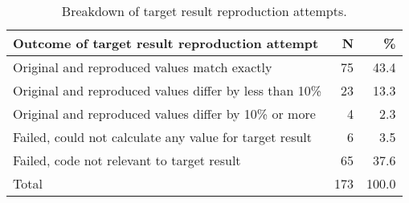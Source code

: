 \begin{table}[ht]
\centering
\begin{tabular}{lrr}
  \hline
Outcome of target result reproduction attempt & N & \% \\ 
  \hline
Original and reproduced values match exactly & 75 & 43.4 \\ 
  Original and reproduced values differ by less than 10\% & 23 & 13.3 \\ 
  Original and reproduced values differ by 10\% or more & 4 & 2.3 \\ 
  Failed, could not calculate any value for target result & 6 & 3.5 \\ 
  Failed, code not relevant to target result & 65 & 37.6 \\ 
  Total & 173 & 100.0 \\ 
   \hline
\end{tabular}
\caption{Breakdown of target result reproduction attempts.} 
\label{tab:ma_res_repro_summary_relevant}
\end{table}
